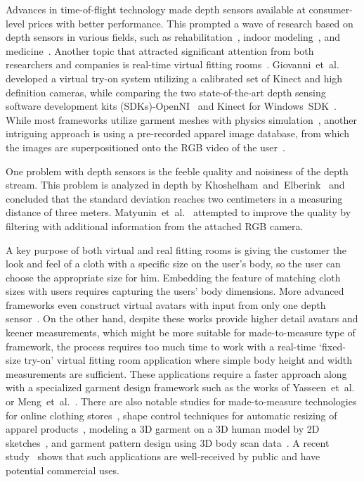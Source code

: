 Advances in time-of-flight technology made depth sensors available at consumer-level prices with better performance. This prompted a wave of research 
based on depth sensors in various fields, such as rehabilitation~\cite{Chang2011}, indoor modeling~\cite{Henry2012}, and medicine~\cite{Gallo2011}. Another 
topic that attracted significant attention from both researchers and companies is real-time virtual fitting rooms~\cite{Meng2010}. Giovanni~et~al.~\cite{Giovanni2012} 
developed a virtual try-on system utilizing a calibrated set of Kinect and high definition cameras, while comparing the two state-of-the-art depth sensing software 
development kits (SDKs)-OpenNI~\cite{OpenNI2102} and Kinect for Windows~SDK~\cite{Microsoft2013}. While most frameworks utilize garment meshes with physics 
simulation~\cite{Fitnect2012,Styku2013}, another intriguing approach is using a pre-recorded apparel image database, from which the images are superpositioned onto the
RGB video of the user~\cite{Hauswiesner2013,Zhou2012}.  

One problem with depth sensors is the feeble quality and noisiness of the depth stream. This problem is analyzed in depth by Khoshelham~and~Elberink~\cite{Khoshelham2012}
 and concluded that the standard deviation reaches two centimeters in a measuring distance of three meters. Matyunin~et~al.~\cite{Matyunin2011} attempted to improve the 
 quality by filtering with additional information from the attached RGB camera.  

A key purpose of both virtual and real fitting rooms is giving the customer the look and feel of a cloth with a specific size on the user's body, so the user can choose
the appropriate size for him. Embedding the feature of matching cloth sizes with users requires capturing the users' body dimensions. More advanced frameworks even construct
virtual avatars with input from only one depth sensor~\cite{Cui2013,Cui2010}. On the other hand, despite these works provide higher detail avatars and keener measurements,
which might be more suitable for made-to-measure type of framework, the process requires too much time to work with a real-time `fixed-size try-on' virtual fitting room application
where simple body height and width measurements are sufficient. These applications require a faster approach along with a specialized garment design framework such as the works of 
Yasseen~et~al.~\cite{Yasseen2013} or Meng~et~al.~\cite{Meng2010}. There are also notable studies for made-to-measure technologies for online clothing stores~\cite{Cordier2003},
shape control techniques for automatic resizing of apparel products~\cite{Meng2012}, modeling a 3D garment on a 3D human model by 2D sketches~\cite{Wang2003}, and garment pattern
design using 3D body scan data~\cite{Kim2003}. A recent study~\cite{Kim2013} shows that such applications are well-received by public and have potential commercial uses.     

